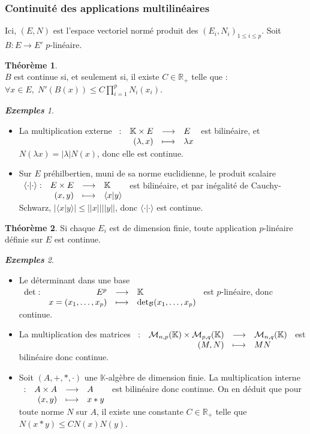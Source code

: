 \documentclass[12pt]{book}
\let\ensembleNombre\mathbb
\newcommand*\R{\ensuremath{\ensembleNombre{R}}}
\newcommand*\K{\ensuremath{\ensembleNombre{K}}}
\newcommand*\B{\ensuremath{\mathcal B}}
\newcommand{\app}[5]{\ensuremath{
\begin{array}[t]{lrcl}
#1 : & #2 & \longrightarrow & #3 \\
    & #4 & \longmapsto & #5 \end{array}
}}
\theoremstyle{definition}
\newtheorem{thme}{Théorème}[chapter]
\theoremstyle{remark}
\newtheorem*{exs}{\textbf{Exemples}}
\newenvironment{fthme}
  {\begin{mdframed}[roundcorner=10pt, linewidth=2pt]\begin{thme}}
  {\end{thme}\end{mdframed}}
\begin{document}
			\subsubsection{Continuité des applications multilinéaires}
	Ici, $(E,N)$ est l'espace vectoriel normé produit des $(E_i, N_i)_{1 \leq i \leq p}$. Soit $B : E \longrightarrow E'$ $p$-linéaire.
	
	\begin{fthme}\mbox{~}\\
	$B$ est continue si, et seulement si, il existe $C \in \R_+$ telle que : $\forall x \in E,\; N'(B(x)) \leq C \prod_{i=1}^p N_i(x_i)$.
	\end{fthme}
	
	\begin{exs}\mbox{~}\\
	\begin{itemize}
	\item[1)] La multiplication externe $\app{}{\K \times E}{E}{(\lambda, x)}{\lambda x}$ est bilinéaire, et $N(\lambda x) = |\lambda| N(x)$, donc elle est continue.
	\item[2)] Sur $E$ préhilbertien, muni de sa norme euclidienne, le produit scalaire $\app{\langle \cdot | \cdot \rangle}{E \times E}{\K}{(x,y)}{\langle x | y \rangle}$ est bilinéaire, et par inégalité de Cauchy-Schwarz, $|\langle x | y \rangle | \leq ||x||||y||$, donc $\langle \cdot | \cdot \rangle$ est continue.
	\end{itemize}
	\end{exs}
	
	\begin{fthme}
	Si chaque $E_i$ est de dimension finie, toute application $p$-linéaire définie sur $E$ est continue.
	\end{fthme}
	
	\begin{exs}\mbox{~}\\
	\begin{itemize}
	\item[1)] Le déterminant dans une base $\app{\det}{E^p}{\K}{x = (x_1, \ldots, x_p)}{\det_\B (x_1, \ldots, x_p)}$ est $p$-linéaire, donc continue.
	\item[2)] La multiplication des matrices $\app{}{\mathcal M_{n,p}(\K) \times \mathcal M_{p,q}(\K)}{\mathcal M_{n,q}(\K)}{(M,N)}{MN}$ est bilinéaire donc continue.
	\item[3)] Soit $(A,+, *, \cdot)$ une $\K$-algèbre de dimension finie. La multiplication interne $\app{}{A \times A}{A}{(x,y)}{x * y}$ est bilinéaire donc continue. On en déduit que pour toute norme $N$ sur $A$, il existe une constante $C \in \R_+$ telle que $N(x*y) \leq C N(x) N(y)$.
	\end{itemize}
	\end{exs}
	
\end{document}
